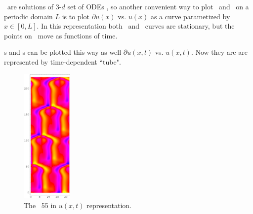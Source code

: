 \Eqv\ are solutions of 3-$d$ set of ODEs  , so
another convenient way to plot \eqva\ and \reqva\ on a periodic
domain $L$ is to plot 
$\partial u(x)$ vs. $u(x)$ as a curve parametized by
$x\in [0,L]$. In this representation both \eqva\ and \reqva\ curves are
stationary, but the points on \reqva\ move as functions of time.

\Po s and \Rpo s can be plotted this way as well
$\partial u(x,t)$ vs. $u(x,t)$. Now they are are represented by time-dependent
``tube".



\begin{figure}[t] %
\centering
 	\includegraphics[width=2.5cm]{figs/rpo22-55-4-u.eps}
\hspace{0.1in}
\caption{
 The \rpo\ {\nameit}55 in $u(x,t)$ representation. 
        }
\label{f:rpo55u}
\end{figure}


